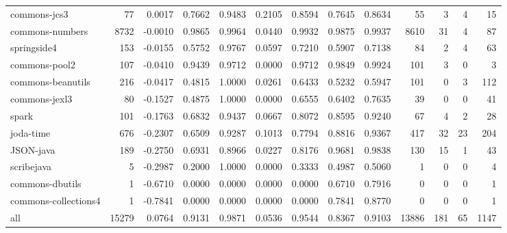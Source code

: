 \begin{table*}
\begin{tabular}{lrrrrrrrrrrrr}
           commons-jcs3 &     77 &      0.0017 &  0.7662 &     0.9483 &     0.2105 &  0.8594 &     0.7645 &   0.8634 &     55 &    3 &   4 &    15 \\
        commons-numbers &   8732 &     -0.0010 &  0.9865 &     0.9964 &     0.0440 &  0.9932 &     0.9875 &   0.9937 &   8610 &   31 &   4 &    87 \\
            springside4 &    153 &     -0.0155 &  0.5752 &     0.9767 &     0.0597 &  0.7210 &     0.5907 &   0.7138 &     84 &    2 &   4 &    63 \\
          commons-pool2 &    107 &     -0.0410 &  0.9439 &     0.9712 &     0.0000 &  0.9712 &     0.9849 &   0.9924 &    101 &    3 &   0 &     3 \\
      commons-beanutils &    216 &     -0.0417 &  0.4815 &     1.0000 &     0.0261 &  0.6433 &     0.5232 &   0.5947 &    101 &    0 &   3 &   112 \\
          commons-jexl3 &     80 &     -0.1527 &  0.4875 &     1.0000 &     0.0000 &  0.6555 &     0.6402 &   0.7635 &     39 &    0 &   0 &    41 \\
                  spark &    101 &     -0.1763 &  0.6832 &     0.9437 &     0.0667 &  0.8072 &     0.8595 &   0.9240 &     67 &    4 &   2 &    28 \\
              joda-time &    676 &     -0.2307 &  0.6509 &     0.9287 &     0.1013 &  0.7794 &     0.8816 &   0.9367 &    417 &   32 &  23 &   204 \\
              JSON-java &    189 &     -0.2750 &  0.6931 &     0.8966 &     0.0227 &  0.8176 &     0.9681 &   0.9838 &    130 &   15 &   1 &    43 \\
             scribejava &      5 &     -0.2987 &  0.2000 &     1.0000 &     0.0000 &  0.3333 &     0.4987 &   0.5060 &      1 &    0 &   0 &     4 \\
        commons-dbutils &      1 &     -0.6710 &  0.0000 &     0.0000 &     0.0000 &  0.0000 &     0.6710 &   0.7916 &      0 &    0 &   0 &     1 \\
   commons-collections4 &      1 &     -0.7841 &  0.0000 &     0.0000 &     0.0000 &  0.0000 &     0.7841 &   0.8770 &      0 &    0 &   0 &     1 \\
                    all &  15279 &      0.0764 &  0.9131 &     0.9871 &     0.0536 &  0.9544 &     0.8367 &   0.9103 &  13886 &  181 &  65 &  1147 \\
\bottomrule
\end{tabular}
\end{table*}
